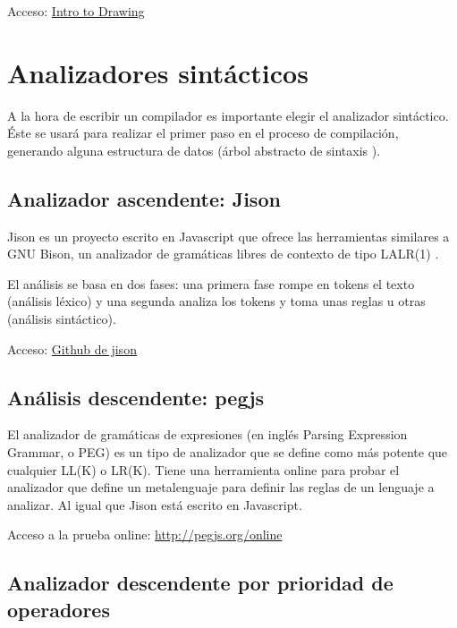 \documentclass{report}
\begin{document}
	\vspace{10px}
	
	Acceso: 
	\href{https://es.khanacademy.org/computing/hour-of-code/hour-of-code-tutorial/p/intro-to-drawing}{Intro to Drawing}
	
	\section{Analizadores sintácticos}
	
	A la hora de escribir un compilador es importante elegir el analizador sintáctico. Éste se usará para realizar el primer paso en el proceso de compilación, generando alguna estructura de datos (árbol abstracto de sintaxis \cite{ast}). 
	
	\subsection{Analizador ascendente: Jison}
	
	Jison es un proyecto escrito en Javascript que ofrece las herramientas similares a GNU Bison, un analizador de gramáticas libres de contexto de tipo LALR(1) \cite{bison}.
	
	El análisis se basa en dos fases: una primera fase rompe en tokens el texto (análisis léxico) y una segunda analiza los tokens y toma unas reglas u otras (análisis sintáctico).  
	
	Acceso:
	\href{https://github.com/zaach/jison}{Github de jison}	
	
	\subsection{Análisis descendente: pegjs}
	
	El analizador de gramáticas de expresiones\cite{peg} (en inglés Parsing Expression Grammar, o PEG) es un tipo de analizador que se define como más potente que cualquier LL(K) o LR(K)\cite{pegjs}. Tiene una herramienta online para probar el analizador que define un metalenguaje para definir las reglas de un lenguaje a analizar. Al igual que Jison está escrito en Javascript.
	
	Acceso a la prueba online:
	\href{http://pegjs.org/online}{http://pegjs.org/online}
	
	\subsection{Analizador descendente por prioridad de operadores}
	
\end{document}
